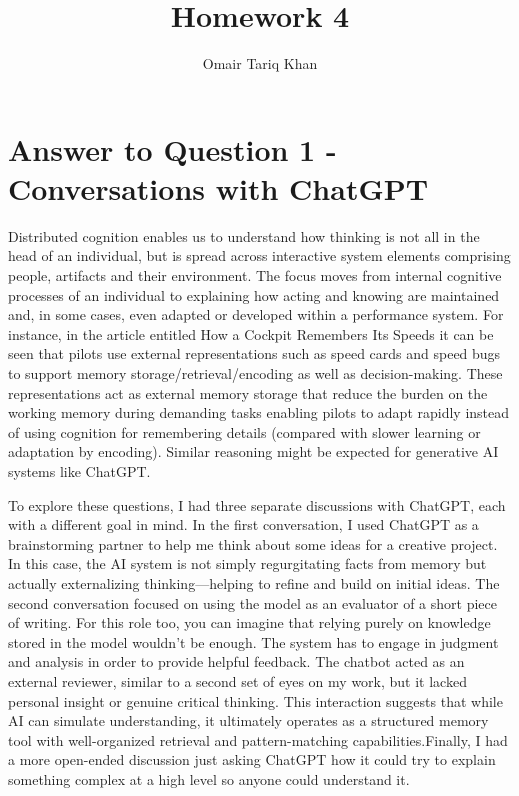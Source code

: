 \documentclass[
	letterpaper, %
]{jdf}
\author{Omair Tariq Khan}
\title{Homework 4}
\begin{document}

\maketitle
\hfill \break
\hfill \break


\section{Answer to Question 1 - Conversations with ChatGPT}
Distributed cognition enables us to understand how thinking is not all in the head of an individual, but is spread across interactive system elements comprising people, artifacts and their environment. The focus moves from internal cognitive processes of an individual to explaining how acting and knowing are maintained and, in some cases, even adapted or developed within a performance system. For instance, in the article entitled How a Cockpit Remembers Its Speeds it can be seen that pilots use external representations such as speed cards and speed bugs to support memory storage/retrieval/encoding as well as decision-making. These representations act as external memory storage that reduce the burden on the working memory during demanding tasks enabling pilots to adapt rapidly instead of using cognition for remembering details (compared with slower learning or adaptation by encoding). Similar reasoning might be expected for generative AI systems like ChatGPT.

To explore these questions, I had three separate discussions with ChatGPT, each with a different goal in mind. In the first conversation, I used ChatGPT as a brainstorming partner to help me think about some ideas for a creative project. In this case, the AI system is not simply regurgitating facts from memory but actually externalizing thinking—helping to refine and build on initial ideas. The second conversation focused on using the model as an evaluator of a short piece of writing. For this role too, you can imagine that relying purely on knowledge stored in the model wouldn’t be enough. The system has to engage in judgment and analysis in order to provide helpful feedback. The chatbot acted as an external reviewer, similar to a second set of eyes on my work, but it lacked personal insight or genuine critical thinking. This interaction suggests that while AI can simulate understanding, it ultimately operates as a structured memory tool with well-organized retrieval and pattern-matching capabilities.Finally, I had a more open-ended discussion just asking ChatGPT how it could try to explain something complex at a high level so anyone could understand it.
\end{document}
